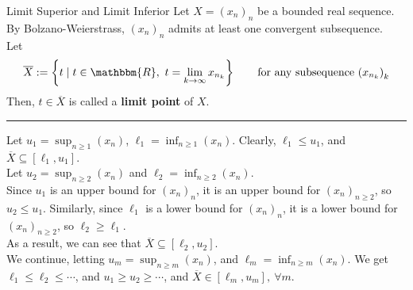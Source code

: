 \documentclass[10pt]{extarticle}
\newcommand{\R}{\mathbbm{R}}
\begin{document}
  \begin{problem}{Limit Superior and Limit Inferior}
    Let $X = (x_n)_n$ be a bounded real sequence. By Bolzano-Weierstrass, $(x_n)_n$ admits at least one convergent subsequence.\\

    Let
    \begin{align*}
      \overline{X} := \left\{t \mid t\in\R,~t = \lim_{k\rightarrow\infty}x_{n_k}\right\} \tag*{for any subsequence $\left(x_{n_k}\right)_k$}
    \end{align*}
    Then, $t\in\overline{X}$ is called a \textbf{limit point} of $X$.\\
    \vspace{4pt}
    \rule{\textwidth}{0.4pt}
    \vspace{4pt}
    Let $u_1 = \sup_{n\geq 1}(x_n)$, $\ell_1 = \inf_{n\geq 1}(x_n)$. Clearly, $\ell_1 \leq u_1$, and $\overline{X} \subseteq [\ell_1,u_1]$.\\

    Let $u_2 = \sup_{n\geq 2}(x_n)$ and $\ell_2 = \inf_{n\geq 2}(x_n)$.\\

    Since $u_1$ is an upper bound for $(x_n)_{n}$, it is an upper bound for $(x_n)_{n\geq 2}$, so $u_2 \leq u_1$. Similarly, since $\ell_1$ is a lower bound for $(x_n)_n$, it is a lower bound for $(x_n)_{n\geq 2}$, so $\ell_2 \geq \ell_1$.\\

    As a result, we can see that $\overline{X} \subseteq [\ell_2,u_2]$.\\

    We continue, letting $u_m = \sup_{n\geq m}(x_n)$, and $\ell_m = \inf_{n\geq m}(x_n)$. We get $\ell_1 \leq \ell_2 \leq \cdots$, and $u_1 \geq u_2 \geq \cdots$, and $\overline{X} \in [\ell_m,u_m],~\forall m$.\\


\end{problem}
\end{document}
